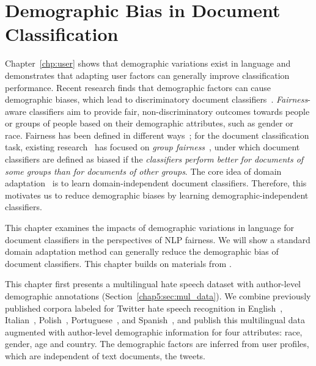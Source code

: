 \chapter{Demographic Bias in Document Classification}
\label{chp:fairness}

Chapter~\ref{chp:user} shows that demographic variations exist in language and demonstrates that adapting user factors can generally improve classification performance.
Recent research finds that demographic factors can cause demographic biases, which lead to discriminatory document classifiers~\cite{dixon2018measuring, kiritchenko2018examining, park2018reducing, garg2019counterfactual, borkan2019nuanced}.
\textit{Fairness}-aware classifiers aim to provide fair, non-discriminatory outcomes towards people or groups of people based on their demographic attributes, such as gender or race. 
Fairness has been defined in different ways~\cite{hardt2016equality, burke2020algorithmic}; for the document classification task, existing research~\cite{dixon2018measuring, kiritchenko2018examining, park2018reducing, garg2019counterfactual, heindorf2019debiasing} has focused on \textit{group fairness}~\cite{chouldechova2018frontiers}, under which document classifiers are defined as biased if the \textit{classifiers perform better for documents of some groups than for documents of other groups}.
The core idea of domain adaptation~\cite{daume2007frustratingly} is to learn domain-independent document classifiers.
Therefore, this motivates us to reduce demographic biases by learning demographic-independent classifiers.

This chapter examines the impacts of demographic variations in language for document classifiers in the perspectives of NLP fairness.
We will show a standard domain adaptation method can generally reduce the demographic bias of document classifiers.
This chapter builds on materials from \cite{huang2020multilingual}.

This chapter first presents a multilingual hate speech dataset with author-level demographic annotations (Section~\ref{chap5:sec:mul_data}). 
We combine previously published corpora labeled for Twitter hate speech recognition in English~\cite{waseem2016hateful,waseem2016you,founta2018large}, Italian~\cite{sanguinetti2018italian}, Polish~\cite{ptaszynski2017learning}, Portuguese~\cite{fortuna2019hierarchically}, and Spanish~\cite{basile2019semeval}, and publish this multilingual data augmented with author-level demographic information for four attributes: race, gender, age and country.
The demographic factors are inferred from user profiles, which are independent of text documents, the tweets.

